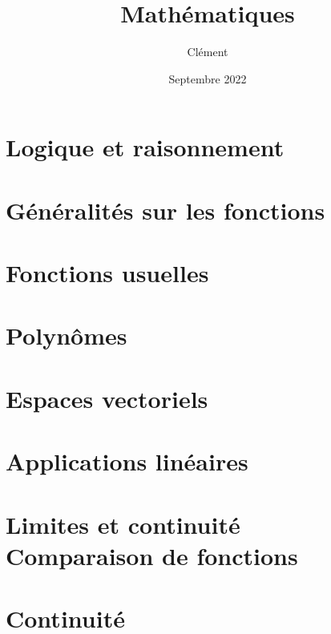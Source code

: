\documentclass[13pt, twoside, a4paper, french]{report}
\newcommand*{\getSubject}{Mathématiques}
\begin{document}
    \title{\getSubject}
    \author{Clément }
    \date{Septembre 2022}
    \tableofcontents

    \chapter{Logique et raisonnement}\label{ch:logique-et-raisonnement}
        


    \chapter{Généralités sur les fonctions}\label{ch:generalites-sur-les-fonctions}
        


    \chapter{Fonctions usuelles}\label{ch:fonctions-usuelles}
        


    \chapter{Polynômes}\label{ch:polynomes}
        


    \chapter{Espaces vectoriels}\label{ch:espaces-vectoriels}
        


    \chapter{Applications linéaires}\label{ch:applications-lineaires}
        


    \chapter{Limites et continuité\\Comparaison de fonctions}\label{ch:limites-est-continuite---comparaison-de-fonctions}
        


    \chapter{Continuité}\label{ch:continuite}
        
\end{document}
